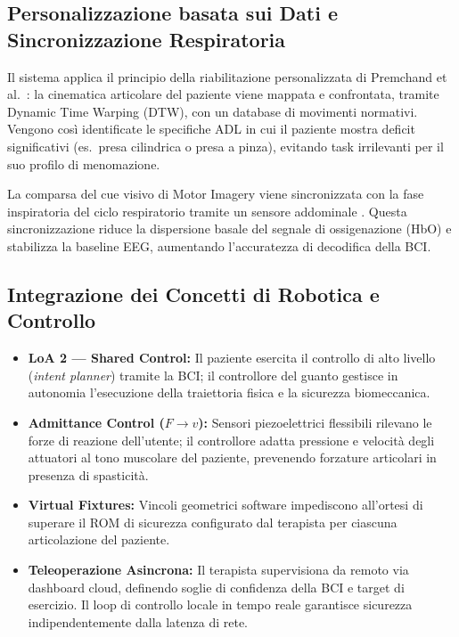 \documentclass[a4paper,11pt]{article}
\begin{document}
\subsection{Personalizzazione basata sui Dati e Sincronizzazione Respiratoria}
Il sistema applica il principio della riabilitazione personalizzata di Premchand et al.\
\cite{premchand2025personalized}: la cinematica articolare del paziente viene mappata
e confrontata, tramite Dynamic Time Warping (DTW), con un database di movimenti
normativi. Vengono così identificate le specifiche ADL in cui il paziente mostra
deficit significativi (es.\ presa cilindrica o presa a pinza), evitando task irrilevanti
per il suo profilo di menomazione.

La comparsa del cue visivo di Motor Imagery viene sincronizzata con la fase inspiratoria
del ciclo respiratorio tramite un sensore addominale \cite{premchand2025personalized}.
Questa sincronizzazione riduce la dispersione basale del segnale di ossigenazione (HbO)
e stabilizza la baseline EEG, aumentando l'accuratezza di decodifica della BCI.

\subsection{Integrazione dei Concetti di Robotica e Controllo}
\begin{itemize}
    \item \textbf{LoA 2 — Shared Control:} Il paziente esercita il controllo di
    alto livello (\textit{intent planner}) tramite la BCI; il controllore del guanto
    gestisce in autonomia l'esecuzione della traiettoria fisica e la sicurezza
    biomeccanica.
    \item \textbf{Admittance Control ($F \to v$):} Sensori piezoelettrici flessibili
    rilevano le forze di reazione dell'utente; il controllore adatta pressione e
    velocità degli attuatori al tono muscolare del paziente, prevenendo forzature
    articolari in presenza di spasticità.
    \item \textbf{Virtual Fixtures:} Vincoli geometrici software impediscono
    all'ortesi di superare il ROM di sicurezza configurato dal terapista per
    ciascuna articolazione del paziente.
    \item \textbf{Teleoperazione Asincrona:} Il terapista supervisiona da remoto
    via dashboard cloud, definendo soglie di confidenza della BCI e target di
    esercizio. Il loop di controllo locale in tempo reale garantisce sicurezza
    indipendentemente dalla latenza di rete.
\end{itemize}
\end{document}
